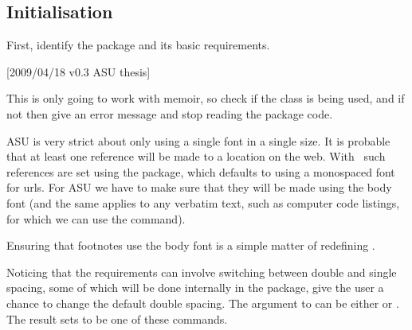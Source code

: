 \subsection{Initialisation}

    First, identify the package and its basic requirements.
\begin{lcode}
[2009/04/18 v0.3 ASU thesis]
\end{lcode}
This is only going to work with memoir, so check if the class is being
used, and if not then give an error message and stop reading the package code.
\begin{lcode}
\endpwasu

\end{lcode}

    ASU is very strict about only using a single font in a single size. 
It is probable that
at least one reference will be made to a location on the web. With \ltx\
such references are set using the  package, which defaults
to using a monospaced font for urls. For ASU we have to make sure that
they will be made using the body font (and the same applies to any verbatim
text, such as computer code listings, for which we can use the 
\cmd{\setverbatimfont} command).
\begin{lcode}
\usepackage{url}
\setverbatimfont{\normalfont\rmfamily}%
\end{lcode}
Ensuring that footnotes use the body font is a simple matter of redefining
\cmd{\foottextfont}.
\begin{lcode}
\renewcommand*{\foottextfont}{\normalfont\normalsize}

\end{lcode}


    Noticing that the requirements can involve switching between double
and single spacing, some of which will be done internally in the package,
give the user a chance to change the default double spacing. The argument
to \cs{setasuspacing} can be either \cmd{\OnehalfSpacing} or \cmd{\DoubleSpacing}.
 The result sets \cs{AsuSpacing} to be one of these commands.
\begin{lcode}
\newcommand*{\setasuspacing}[1]{%
  \let\AsuSpacing#1
  \AsuSpacing}
\setasuspacing{\DoubleSpacing}
\end{lcode}

